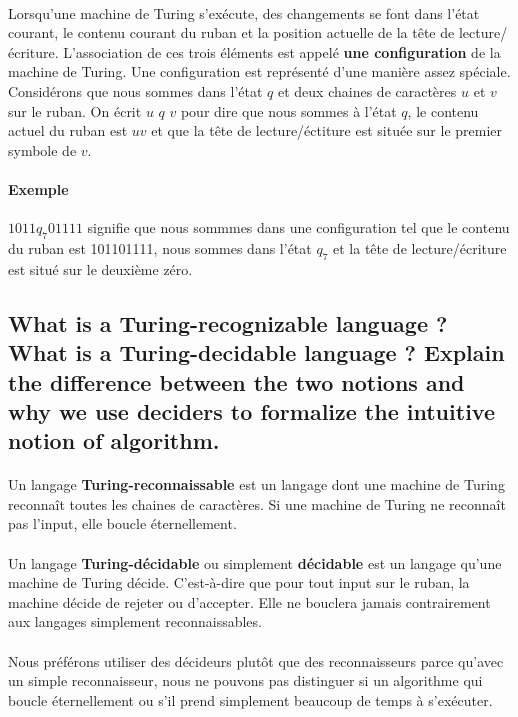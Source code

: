 \paragraph{}
Lorsqu'une machine de Turing s'exécute, des changements se font dans l'état courant, le contenu courant du ruban et la position actuelle de la tête de lecture/écriture. L'association de ces trois éléments est appelé \textbf{une configuration} de la machine de Turing. Une configuration est représenté d'une manière assez spéciale. Considérons que nous sommes dans l'état $q$ et deux chaines de caractères $u$ et $v$ sur le ruban. On écrit $u$ $q$ $v$ pour dire que nous sommes à l'état $q$, le contenu actuel du ruban est $uv$ et que la tête de lecture/éctiture est située sur le premier symbole de $v$.
\paragraph{Exemple} $1011q_{7}01111$ signifie que nous sommmes dans une configuration tel que le contenu du ruban est 101101111, nous sommes dans l'état $q_{7}$ et la tête de lecture/écriture est situé sur le deuxième zéro.

\subsection{What is a Turing-recognizable language ? What is a Turing-decidable language ? Explain the difference between the two notions and why we use deciders to formalize the intuitive notion of algorithm.}
\paragraph{}
Un langage \textbf{Turing-reconnaissable} est un langage dont une machine de Turing reconnaît toutes les chaines de caractères. Si une machine de Turing 
ne reconnaît pas l'input, elle boucle éternellement.
\paragraph{}
Un langage \textbf{Turing-décidable} ou simplement \textbf{décidable} est un langage qu'une machine de Turing décide. C'est-à-dire que pour tout input sur le ruban, la machine décide de rejeter ou d'accepter. Elle ne bouclera jamais contrairement aux langages simplement reconnaissables.

\paragraph{}
Nous préférons utiliser des décideurs plutôt que des reconnaisseurs parce qu'avec un simple reconnaisseur, nous ne pouvons pas distinguer si un algorithme qui boucle éternellement ou s'il prend simplement beaucoup de temps à s'exécuter.

